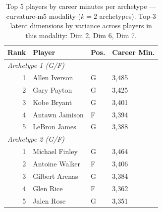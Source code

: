 \begin{table}[htbp]
  \centering\small
  \begin{tabular}{rlll}
    \toprule
    Rank & Player & Pos. & Career Min. \\
    \midrule
    \multicolumn{4}{l}{\textit{Archetype 1 (G/F)}} \\
    \midrule
    1 & Allen Iverson & G & 3,485 \\
    2 & Gary Payton & G & 3,425 \\
    3 & Kobe Bryant & G & 3,401 \\
    4 & Antawn Jamison & F & 3,394 \\
    5 & LeBron James & G & 3,388 \\
    \midrule[0.4pt]
    \multicolumn{4}{l}{\textit{Archetype 2 (G/F)}} \\
    \midrule
    1 & Michael Finley & G & 3,464 \\
    2 & Antoine Walker & F & 3,406 \\
    3 & Gilbert Arenas & G & 3,384 \\
    4 & Glen Rice & F & 3,362 \\
    5 & Jalen Rose & G & 3,351 \\
    \bottomrule
  \end{tabular}
  \caption{Top 5 players by career minutes per archetype --- curvature-m5 modality ($k=2$ archetypes). Top-3 latent dimensions by variance across players in this modality: Dim 2, Dim 6, Dim 7.}
  \label{tab:arch_reps_curvature_m5}
\end{table}

